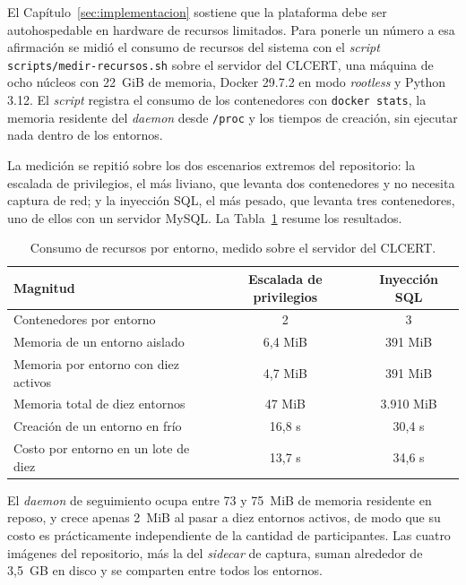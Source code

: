 El Capítulo~\ref{sec:implementacion} sostiene que la plataforma debe ser
autohospedable en hardware de recursos limitados. Para ponerle un número a esa
afirmación se midió el consumo de recursos del sistema con el \textit{script}
\texttt{scripts/medir-recursos.sh} sobre el servidor del CLCERT, una máquina de
ocho núcleos con 22~GiB de memoria, Docker 29.7.2 en modo \textit{rootless} y
Python 3.12. El \textit{script} registra el consumo de los contenedores con
\texttt{docker stats}, la memoria residente del \textit{daemon} desde
\texttt{/proc} y los tiempos de creación, sin ejecutar nada dentro de los
entornos.

La medición se repitió sobre los dos escenarios extremos del repositorio: la
escalada de privilegios, el más liviano, que levanta dos contenedores y no
necesita captura de red; y la inyección SQL, el más pesado, que levanta tres
contenedores, uno de ellos con un servidor MySQL. La
Tabla~\ref{tab:medicion-recursos} resume los resultados.

\begin{table}[h]
\centering
\caption{Consumo de recursos por entorno, medido sobre el servidor del CLCERT.}
\label{tab:medicion-recursos}
\begin{tabular}{|p{6.5cm}|c|c|}
\hline
\textbf{Magnitud} & \textbf{Escalada de privilegios} & \textbf{Inyección SQL} \\
\hline
Contenedores por entorno              & 2        & 3 \\
Memoria de un entorno aislado         & 6,4 MiB  & 391 MiB \\
Memoria por entorno con diez activos  & 4,7 MiB  & 391 MiB \\
Memoria total de diez entornos        & 47 MiB   & 3.910 MiB \\
Creación de un entorno en frío        & 16,8 s   & 30,4 s \\
Costo por entorno en un lote de diez  & 13,7 s   & 34,6 s \\
\hline
\end{tabular}
\end{table}

El \textit{daemon} de seguimiento ocupa entre 73 y 75~MiB de memoria residente
en reposo, y crece apenas 2~MiB al pasar a diez entornos activos, de modo que su
costo es prácticamente independiente de la cantidad de participantes. Las cuatro
imágenes del repositorio, más la del \textit{sidecar} de captura, suman alrededor
de 3,5~GB en disco y se comparten entre todos los entornos.

